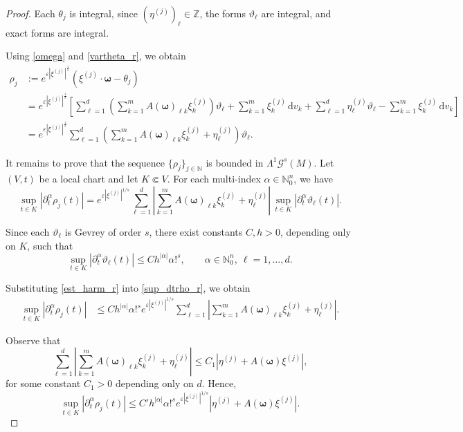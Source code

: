 \documentclass[10pt,a4paper]{amsart}
\begin{document}
\begin{proof}
	Each $\theta_j$ is integral, since $(\eta^{(j)})_\ell\in\mathbb{Z}$, 
	the forms $\vartheta_\ell$ are integral, and exact forms are integral.
	
	Using \eqref{omega} and \eqref{vartheta_r}, we obtain
	\begin{align*}
		\rho_j & := e^{\varepsilon|\xi^{(j)}|^{\frac{1}{s}}}(\xi^{(j)} \cdot \boldsymbol{\omega} - \theta_j)\\
		& = e^{\varepsilon|\xi^{(j)}|^{\frac{1}{s}}}\left[\sum_{\ell=1}^{d}\left(\sum_{k=1}^{m}A(\boldsymbol{\omega})_{\ell k}\xi^{(j)}_k\right)\vartheta_\ell + \sum_{k=1}^{m}\xi^{(j)}_k\,\mathrm{d}v_k + \sum_{\ell=1}^{d}\eta^{(j)}_\ell\vartheta_\ell - \sum_{k=1}^{m}\xi^{(j)}_k\,\mathrm{d}v_k\right]\\
		& = e^{\varepsilon|\xi^{(j)}|^{\frac{1}{s}}} \sum_{\ell=1}^{d} \left(\sum_{k=1}^{m} A(\boldsymbol{\omega})_{\ell k}\xi^{(j)}_k + \eta^{(j)}_\ell\right)\vartheta_\ell.
	\end{align*}
	
	
	It remains to prove that the sequence $\{\rho_j\}_{j\in\mathbb{N}}$ is bounded in 	$\mathsf{\Lambda}^1 \mathscr{G}^s(M)$. Let $(V,t)$ be a local chart and let $K\Subset V$.  For each multi-index $\alpha\in\mathbb{N}_0^n$, we have 
	\begin{equation}\label{sup_dtrho_r}
		\sup_{t\in K} |\partial_t^\alpha \rho_j(t)| 
		= e^{\varepsilon|\xi^{(j)}|^{1/s}} \sum_{\ell=1}^d 	\left| \sum_{k=1}^m
		A(\boldsymbol{\omega})_{\ell k}\xi^{(j)}_k + \eta^{(j)}_\ell \right|
		\, 	\sup_{t\in K} |\partial_t^\alpha \vartheta_\ell(t)|.
	\end{equation}
	
	Since each $\vartheta_\ell$ is Gevrey of order $s$, 
	there exist constants $C,h>0$, depending only on $K$, such that
	\begin{equation}\label{est_harm_r}
		\sup_{t\in K}	|\partial_t^\alpha \vartheta_\ell(t)|
		\le C h^{|\alpha|}\alpha!^s, \qquad \alpha\in\mathbb{N}_0^n,\ \ell=1,\dots,d.
	\end{equation}
	
	Substituting \eqref{est_harm_r} into \eqref{sup_dtrho_r}, we obtain
	\begin{align*}
		\sup_{t\in K} |\partial_t^\alpha \rho_j(t)|
		&\le C h^{|\alpha|}\alpha!^s e^{\varepsilon|\xi^{(j)}|^{1/s}} \sum_{\ell=1}^d
		\left| \sum_{k=1}^m A(\boldsymbol{\omega})_{\ell k}\xi^{(j)}_k + \eta^{(j)}_\ell 	\right|.
	\end{align*}
	
	Observe that
	\[
	\sum_{\ell=1}^d \left| \sum_{k=1}^m A(\boldsymbol{\omega})_{\ell k}\xi^{(j)}_k +
	\eta^{(j)}_\ell \right|
	\le C_1 |\eta^{(j)} + A(\boldsymbol{\omega})\xi^{(j)}|, 
	\]
	for some constant $C_1>0$ depending only on $d$.  Hence,
	\[
	\sup_{t\in K} |\partial_t^\alpha \rho_j(t)| \le C' h^{|\alpha|}\alpha!^s 
	e^{\varepsilon|\xi^{(j)}|^{1/s}} |\eta^{(j)} + A(\boldsymbol{\omega})\xi^{(j)}|.
	\]
	

\end{proof}
\end{document}
